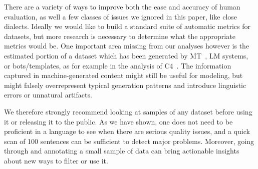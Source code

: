 There are a variety of ways to improve both the ease and accuracy of human evaluation, as well a few classes of issues we ignored in this paper, like close dialects.
Ideally we would like to build a standard suite of automatic metrics for datasets, but more research is necessary to determine what the appropriate metrics would be. One important area missing from our analyses however is the estimated portion of a dataset which has been generated by MT~\citep{rarrick-etal-2011-mt}, LM systems, or bots/templates, as for example in the analysis of C4~\citep{dodge-etal-2021-documenting}. %
The information captured in machine-generated content might still be useful for modeling, but might falsely overrepresent typical generation patterns and introduce linguistic errors or unnatural artifacts.



We therefore strongly recommend looking at samples of any dataset before using it or releasing it to the public. As we have shown, one does not need to be proficient in a language to see when there are serious quality issues, and a quick scan of 100 sentences can be sufficient to detect major problems. Moreover, going through and annotating a small sample of data can bring actionable insights about new ways to filter or use it.

